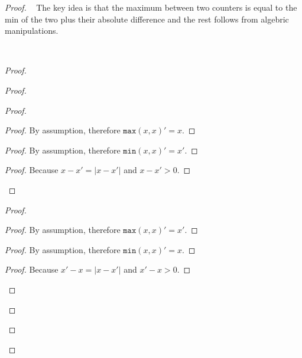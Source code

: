\documentclass[9pt]{article}   	%
\begin{document}
\begin{proof}
\pfsketch~ The key idea is that the maximum between two counters is equal to the min of the two plus their absolute difference and the rest follows from algebric manipulations.
	
\pf~	
	\begin{proof}
		\begin{proof}
			\begin{proof}
				\begin{proof}
					By assumption, therefore $\texttt{max}(x,x)' = x$.
				\end{proof}
				
				\begin{proof}
					By assumption, therefore $\texttt{min}(x,x)' = x'$.
				\end{proof}
				
				\qedstep
				\begin{proof}
					Because $x - x' = | x - x' |$ and $x - x' > 0$.
				\end{proof}
			\end{proof}
			
			\begin{proof}
				\begin{proof}
					By assumption, therefore $\texttt{max}(x,x)' = x'$.
				\end{proof}
				
				\begin{proof}
					By assumption, therefore $\texttt{min}(x,x)' = x$.
				\end{proof}
				
				\qedstep
				\begin{proof}
					Because $x'-x = | x - x' |$ and $x' - x > 0$.
				\end{proof}
			\end{proof}
			

\end{proof}
\end{proof}
\end{proof}
\end{document}
